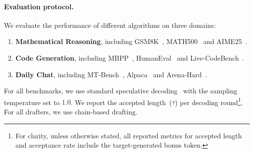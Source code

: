 \paragraph{Evaluation protocol.}
We evaluate the performance of different algorithms on three domains:
\begin{enumerate}
    \item \textbf{Mathematical Reasoning}, including GSM8K~\citep{cobbe2021gsm8k}, MATH500~\citep{lightman2023lets} and AIME25~\citep{aime25}.
    \item \textbf{Code Generation}, including MBPP~\citep{austin2021program}, HumanEval~\citep{chen2021codex} and Live-CodeBench~\citep{jain2025livecodebench}.
    \item \textbf{Daily Chat}, including MT-Bench~\citep{zheng2023judging}, Alpaca~\citep{alpaca} and Arena-Hard~\citep{arenahard2024,li2024crowdsourced}.
\end{enumerate}
For all benchmarks, we use standard speculative decoding~\citep{pmlr-v202-leviathan23a,chen2023accelerating} with the sampling temperature set to $1.0$. We report the accepted length~($\tau$) per decoding round\footnote{For clarity, unless otherwise stated, all reported metrics for accepted length and acceptance rate include the target-generated bonus token.}. For all drafters, we use chain-based drafting.


